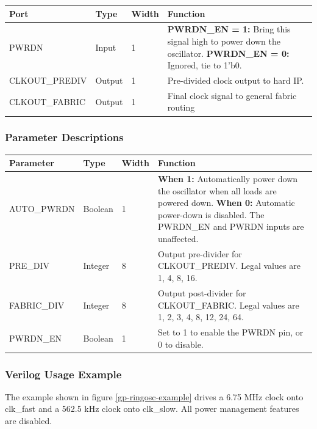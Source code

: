 \documentclass{article}
\begin{document}
\begin{tabularx}{5in}{|l|l|l|X|}
\hline
{\bfseries Port} & {\bfseries Type} & {\bfseries Width} & {\bfseries Function} \\
\hline
PWRDN & Input & 1 &
	{\bfseries PWRDN\_EN = 1:} \newline Bring this signal high to power down the oscillator. \newline
	{\bfseries PWRDN\_EN = 0:} \newline Ignored, tie to 1'b0.\\
\hline
CLKOUT\_PREDIV & Output & 1 & Pre-divided clock output to hard IP.  \\
\hline
CLKOUT\_FABRIC & Output & 1 & Final clock signal to general fabric routing\\
\hline
\end{tabularx}

\subsubsection{Parameter Descriptions}

\begin{tabularx}{5in}{|l|l|l|X|}
\hline
{\bfseries Parameter} & {\bfseries Type} & {\bfseries Width} & {\bfseries Function} \\
\hline
AUTO\_PWRDN & Boolean & 1 & 
	{\bfseries When 1: } \newline Automatically power down the oscillator when all loads are powered down. \newline
	{\bfseries When 0: } \newline Automatic power-down is disabled. The PWRDN\_EN and PWRDN inputs are unaffected.\\
\hline
PRE\_DIV & Integer & 8 &
	Output pre-divider for CLKOUT\_PREDIV. Legal values are 1, 4, 8, 16. \\
\hline
FABRIC\_DIV & Integer & 8 &
	Output post-divider for CLKOUT\_FABRIC. Legal values are 1, 2, 3, 4, 8, 12, 24, 64. \\
\hline
PWRDN\_EN & Boolean & 1 & Set to 1 to enable the PWRDN pin, or 0 to disable. \\
\hline
\end{tabularx}

\pagebreak
\subsubsection{Verilog Usage Example}

The example shown in figure \ref{gp-ringosc-example} drives a 6.75 MHz clock onto clk\_fast and a 562.5 kHz clock onto 
clk\_slow. All power management features are disabled.
\end{document}
